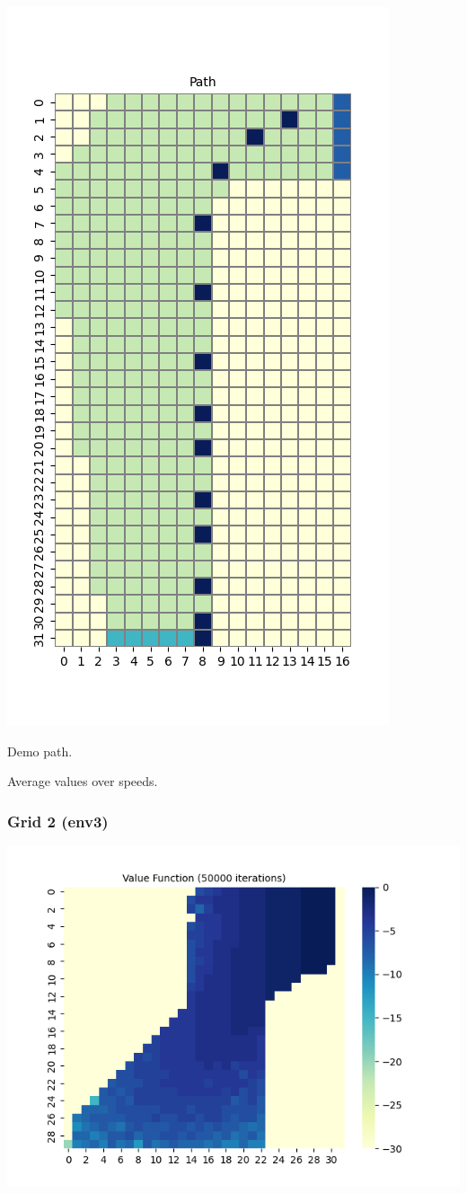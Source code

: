 \documentclass[11pt]{article}
\begin{document}
    \includegraphics[scale=0.7]{env2_demo_e_5_12_8}

    Demo path.

    Average values over speeds.

    \subsubsection{Grid 2 (env3)}
    
    \includegraphics[scale=0.7]{env3_5_3_1_max}
\end{document}
